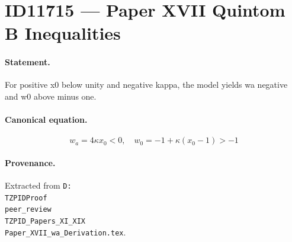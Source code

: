 \section*{ID11715 --- Paper XVII Quintom B Inequalities}

\paragraph{Statement.}
For positive x0 below unity and negative kappa, the model yields wa negative and w0 above minus one.

\paragraph{Canonical equation.}
\[
w_a=4\kappa x_0<0,\quad w_0=-1+\kappa(x_0-1)>-1
\]

\paragraph{Provenance.}
Extracted from \texttt{D:\\TZPIDProof\\peer\_review\\TZPID\_Papers\_XI\_XIX\\Paper\_XVII\_wa\_Derivation.tex}.
